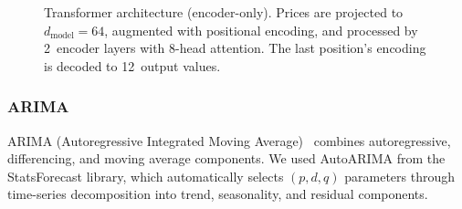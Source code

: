 \documentclass[conference]{IEEEtran}
\begin{document}
\begin{figure}[htbp]
  \caption{Transformer architecture (encoder-only). Prices are projected to $d_{\text{model}}=64$, augmented with positional encoding, and processed by 2~encoder layers with 8-head attention. The last position's encoding is decoded to 12~output values.}
  \label{fig:transformer}
\end{figure}

\subsubsection{ARIMA}

ARIMA (Autoregressive Integrated Moving Average)~\cite{boxjenkins} combines autoregressive, differencing, and moving average components. We used AutoARIMA from the StatsForecast library, which automatically selects $(p, d, q)$ parameters through time-series decomposition into trend, seasonality, and residual components.
\end{document}
